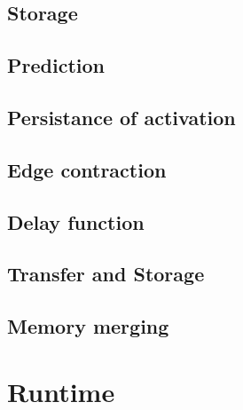\documentclass{book}
\begin{document}
\section{Storage}
\section{Prediction}



\section{Persistance of activation}
\section{Edge contraction}
\section{Delay function}
\section{Transfer and Storage}
\section{Memory merging}

\chapter{Runtime}
\end{document}
